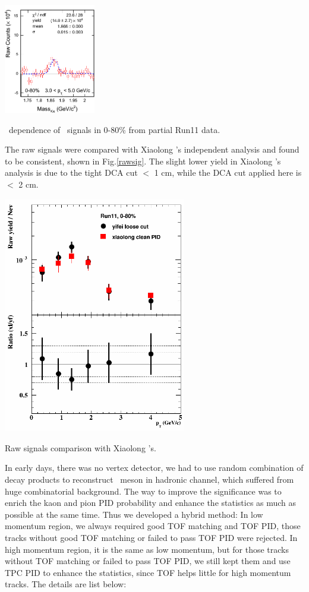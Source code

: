 \includegraphics[width=0.3\textwidth]{figure/Run11_YF/D0_0-80_31_50_signal.png}
\caption{\pt\ dependence of \dzero\ signals in 0-80\% from partial Run11 data.}
\label{D0inpt1}
\efg

The raw signals were compared with Xiaolong 's independent analysis and found to be consistent, shown in Fig.\ref{rawsig}. The slight lower yield in Xiaolong 's analysis is due to the tight DCA cut $<$ 1 cm, while the DCA cut applied here is $<$ 2 cm.

\bfg \centering
\includegraphics[width=0.6\textwidth]{figure/Run11_YF/RawY_0_80.png}
\caption{Raw signals comparison with Xiaolong 's.}
\label{rawsig}
\efg

In early days, there was no vertex detector, we had to use random combination of decay products to reconstruct \dzero\ meson in hadronic channel, which suffered from huge combinatorial background. The way to improve the significance was to enrich the kaon and pion PID probability and enhance the statistics as much as possible at the same time. Thus we developed a hybrid method: In low momentum region, we always required good TOF matching and TOF PID, those tracks without good TOF matching or failed to pass TOF PID were rejected. In high momentum region, it is the same as low momentum, but for those tracks without TOF matching or failed to pass TOF PID, we still kept them and use TPC PID to enhance the statistics, since TOF helps little for high momentum tracks. The details are list below:

